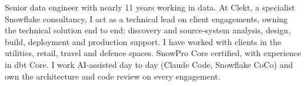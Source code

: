 

\begin{cvparagraph}

Senior data engineer with nearly 11 years working in data. At Clekt, a specialist Snowflake consultancy, I act as a technical lead on client engagements, owning the technical solution end to end: discovery and source-system analysis, design, build, deployment and production support. I have worked with clients in the utilities, retail, travel and defence spaces. SnowPro Core certified, with experience in dbt Core. I work AI-assisted day to day (Claude Code, Snowflake CoCo) and own the architecture and code review on every engagement.
\end{cvparagraph}
